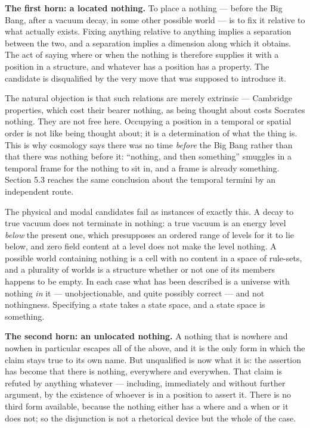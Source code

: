 \documentclass[
]{article}
\begin{document}
\textbf{The first horn: a located nothing.} To place a nothing ---
before the Big Bang, after a vacuum decay, in some other possible world
--- is to fix it relative to what actually exists. Fixing anything
relative to anything implies a separation between the two, and a
separation implies a dimension along which it obtains. The act of saying
where or when the nothing is therefore supplies it with a position in a
structure, and whatever has a position has a property. The candidate is
disqualified by the very move that was supposed to introduce it.

The natural objection is that such relations are merely extrinsic ---
Cambridge properties, which cost their bearer nothing, as being thought
about costs Socrates nothing. They are not free here. Occupying a
position in a temporal or spatial order is not like being thought about;
it is a determination of what the thing is. This is why cosmology says
there was no time \emph{before} the Big Bang rather than that there was
nothing before it: ``nothing, and then something'' smuggles in a
temporal frame for the nothing to sit in, and a frame is already
something. Section 5.3 reaches the same conclusion about the temporal
termini by an independent route.

The physical and modal candidates fail as instances of exactly this. A
decay to true vacuum does not terminate in nothing: a true vacuum is an
energy level \emph{below} the present one, which presupposes an ordered
range of levels for it to lie below, and zero field content at a level
does not make the level nothing. A possible world containing nothing is
a cell with no content in a space of rule-sets, and a plurality of
worlds is a structure whether or not one of its members happens to be
empty. In each case what has been described is a universe with nothing
\emph{in} it --- unobjectionable, and quite possibly correct --- and not
nothingness. Specifying a state takes a state space, and a state space
is something.

\textbf{The second horn: an unlocated nothing.} A nothing that is
nowhere and nowhen in particular escapes all of the above, and it is the
only form in which the claim stays true to its own name. But unqualified
is now what it is: the assertion has become that there is nothing,
everywhere and everywhen. That claim is refuted by anything whatever ---
including, immediately and without further argument, by the existence of
whoever is in a position to assert it. There is no third form available,
because the nothing either has a where and a when or it does not; so the
disjunction is not a rhetorical device but the whole of the case.
\end{document}
